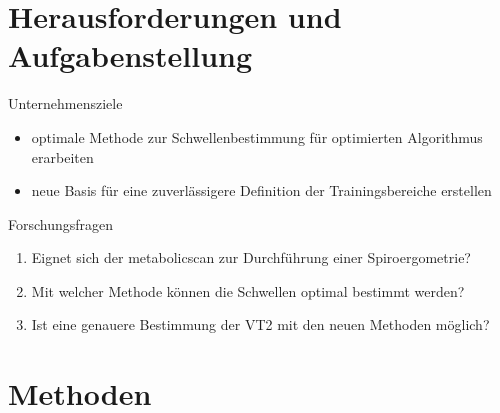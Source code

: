 \documentclass[colorBG,slideColor,8pt]{beamer}
\newcommand{\vcotwo}{\.{V}CO\textsubscript{2}}
\newcommand{\ve}{\.{V}E}
\begin{document}
\begin{frame}
\begin{columns}
\begin{column}{\linewidth}
\begin{figure}[H]
\begin{subfigure}[c]{0.2\linewidth}
		\subcaption{\ve/\vcotwo}
	\end{subfigure}
\end{figure}
\end{column}
\end{columns}
\end{frame}


\section{Herausforderungen und Aufgabenstellung}

\begin{frame}
\begin{block}{Unternehmensziele}
	\begin{itemize}
		\item optimale Methode zur Schwellenbestimmung für optimierten Algorithmus erarbeiten
		\item neue Basis für eine zuverlässigere Definition der Trainingsbereiche erstellen
	\end{itemize}
\end{block}
\begin{block}{Forschungsfragen}
	\begin{enumerate}
		\item Eignet sich der metabolicscan zur Durchführung einer Spiroergometrie?
		\item Mit welcher Methode können die Schwellen optimal bestimmt werden?
		\item Ist eine genauere Bestimmung der VT2 mit den neuen Methoden möglich?
	\end{enumerate}
\end{block}
\end{frame}

\section{Methoden}
\end{document}
